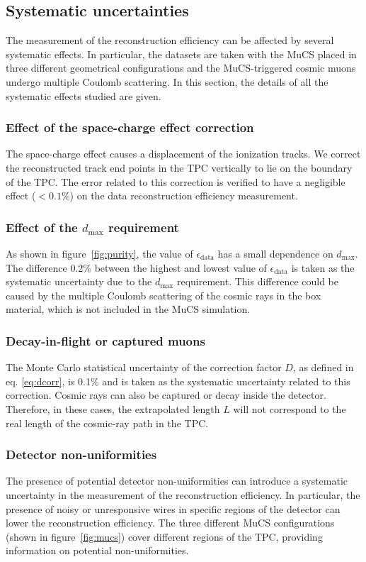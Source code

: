 \documentclass[a4paper,11pt]{article}
\begin{document}
\subsection{Systematic uncertainties}\label{sec:sys}
The measurement of the reconstruction efficiency can be affected by several systematic effects. In particular, the datasets are taken with the MuCS placed in three different geometrical configurations and the MuCS-triggered cosmic muons undergo multiple Coulomb scattering. In this section, the details of all the systematic effects studied are given.

\subsubsection{Effect of the space-charge effect correction}
The space-charge effect causes a displacement of the ionization tracks. We correct the reconstructed track end points in the TPC vertically to lie on the boundary of the TPC. The error related to this correction is verified to have a negligible effect ($<0.1\%$) on the data reconstruction efficiency measurement.

\subsubsection{Effect of the $d_{\mathrm{max}}$ requirement}

As shown in figure~\ref{fig:purity}, the value of $\epsilon_{\mathrm{data}}$ has a small dependence on $d_{\mathrm{max}}$. The difference $0.2\%$ between the highest and lowest value of $\epsilon_{\mathrm{data}}$ is taken as the systematic uncertainty due to the $d_{\mathrm{max}}$ requirement. This difference could be caused by the multiple Coulomb scattering of the cosmic rays in the box material, which is not included in the MuCS simulation.

\subsubsection{Decay-in-flight or captured muons}\label{sec:dif}
The Monte Carlo statistical uncertainty of the correction factor $D$, as defined in eq. \eqref{eq:dcorr}, is 0.1\% and is taken as the systematic uncertainty related to this correction. Cosmic rays can also be captured or decay inside the detector. Therefore, in these cases, the extrapolated length $L$ will not correspond to the real length of the cosmic-ray path in the TPC.

\subsubsection{Detector non-uniformities}\label{sec:wires}
The presence of potential detector non-uniformities can introduce a systematic uncertainty in the measurement of the reconstruction efficiency. In particular, the presence of noisy or unresponsive wires in specific regions of the detector can lower the reconstruction efficiency. The three different MuCS configurations (shown in figure~\ref{fig:mucs}) cover different regions of the TPC, providing information on potential non-uniformities.
\end{document}
